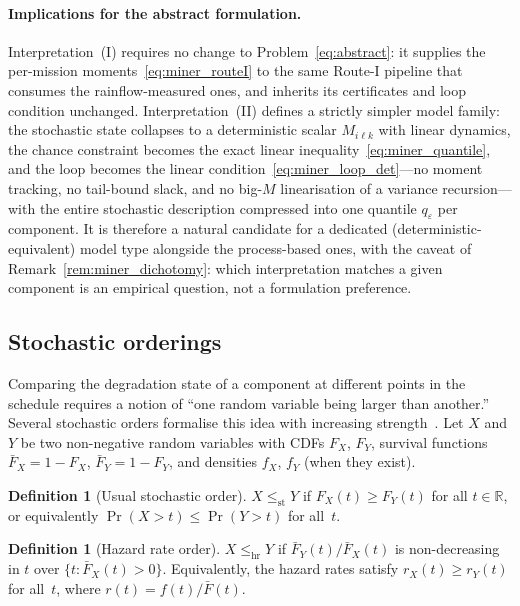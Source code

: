 \documentclass[11pt,a4paper]{article}
\theoremstyle{plain}
\theoremstyle{definition}
\newtheorem{definition}[theorem]{Definition}
\theoremstyle{remark}
\begin{document}
\paragraph{Implications for the abstract formulation.}
Interpretation~(I) requires no change to Problem~\eqref{eq:abstract}: it supplies the per-mission moments~\eqref{eq:miner_routeI} to the same Route-I pipeline that consumes the rainflow-measured ones, and inherits its certificates and loop condition unchanged.
Interpretation~(II) defines a strictly simpler model family: the stochastic state collapses to a deterministic scalar $M_{i\ell k}$ with linear dynamics, the chance constraint becomes the exact linear inequality~\eqref{eq:miner_quantile}, and the loop becomes the linear condition~\eqref{eq:miner_loop_det}---no moment tracking, no tail-bound slack, and no big-$M$ linearisation of a variance recursion---with the entire stochastic description compressed into one quantile $q_\varepsilon$ per component.
It is therefore a natural candidate for a dedicated (deterministic-equivalent) model type alongside the process-based ones, with the caveat of Remark~\ref{rem:miner_dichotomy}: which interpretation matches a given component is an empirical question, not a formulation preference.

\subsection{Stochastic orderings}
\label{sec:stoch_orders}

Comparing the degradation state of a component at different points in the schedule requires a notion of ``one random variable being larger than another.''
Several stochastic orders formalise this idea with increasing strength~\cite{ShakedShanthikumar2007,WikiStochDom}.
Let $X$ and $Y$ be two non-negative random variables with CDFs $F_X$, $F_Y$, survival functions $\bar F_X = 1-F_X$, $\bar F_Y = 1-F_Y$, and densities $f_X$, $f_Y$ (when they exist).

\begin{definition}[Usual stochastic order]\label{def:st}
  $X \le_{\mathrm{st}} Y$ if $F_X(t) \ge F_Y(t)$ for all $t \in \mathbb{R}$,
  or equivalently $\Pr(X > t) \le \Pr(Y > t)$ for all~$t$.
\end{definition}

\begin{definition}[Hazard rate order]\label{def:hr}
  $X \le_{\mathrm{hr}} Y$ if $\bar F_Y(t)/\bar F_X(t)$ is non-decreasing in $t$ over $\{t : \bar F_X(t) > 0\}$.
  Equivalently, the hazard rates satisfy $r_X(t) \ge r_Y(t)$ for all~$t$, where $r(t) = f(t)/\bar F(t)$.
\end{definition}
\end{document}
